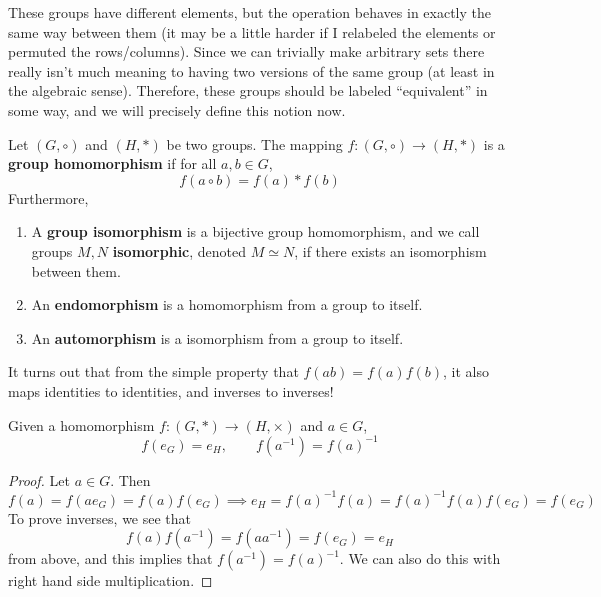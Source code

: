   These groups have different elements, but the operation behaves in exactly the same way between them (it may be a little harder if I relabeled the elements or permuted the rows/columns). Since we can trivially make arbitrary sets there really isn't much meaning to having two versions of the same group (at least in the algebraic sense). Therefore, these groups should be labeled ``equivalent'' in some way, and we will precisely define this notion now. 

  \begin{definition}
    Let $(G, \circ)$ and $(H, *)$ be two groups. The mapping $f: (G, \circ) \longrightarrow (H, *)$ is a \textbf{group homomorphism} if for all $a, b \in G$, 
    \begin{equation}
      f(a \circ b) = f(a) * f(b)
    \end{equation} 
    Furthermore, 
    \begin{enumerate}
      \item A \textbf{group isomorphism} is a bijective group homomorphism, and we call groups $M, N$ \textbf{isomorphic}, denoted $M \simeq N$, if there exists an isomorphism between them. 
      \item An \textbf{endomorphism} is a homomorphism from a group to itself. 
      \item An \textbf{automorphism} is a isomorphism from a group to itself. 
    \end{enumerate}
  \end{definition} 

  It turns out that from the simple property that $f(ab) = f(a) f(b)$, it also maps identities to identities, and inverses to inverses!  

  \begin{lemma}
    Given a homomorphism $f: (G, \ast) \rightarrow (H, \times)$ and $a \in G$, 
    \begin{equation}
      f(e_G) = e_H, \qquad f(a^{-1}) = f(a)^{-1}
    \end{equation}
  \end{lemma}
  \begin{proof}
    Let $a \in G$. Then 
    \begin{equation}
      f(a) = f(a e_G) = f(a) f(e_G) \implies e_H = f(a)^{-1} f(a) = f(a)^{-1} f(a) f(e_G) = f(e_G)
    \end{equation}
    To prove inverses, we see that 
    \begin{equation}
      f(a) f(a^{-1}) = f(a a^{-1}) = f(e_G) = e_H
    \end{equation}
    from above, and this implies that $f(a^{-1}) = f(a)^{-1}$. We can also do this with right hand side multiplication. 
  \end{proof}

